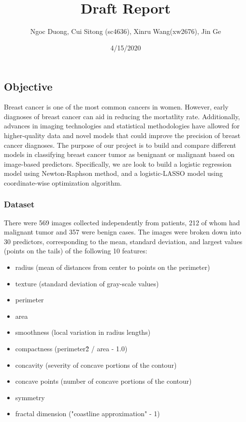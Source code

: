 \documentclass[]{article}
\title{Draft Report}
\author{Ngoc Duong, Cui Sitong (sc4636), Xinru Wang(xw2676), Jin Ge}
\date{4/15/2020}
\begin{document}
\maketitle

\hypertarget{objective}{%
\subsection{Objective}\label{objective}}

Breast cancer is one of the most common cancers in women. However, early
diagnoses of breast cancer can aid in reducing the mortatlity rate.
Additionally, advances in imaging technologies and statistical
methodologies have allowed for higher-quality data and novel models that
could improve the precision of breast cancer diagnoses. The purpose of
our project is to build and compare different models in classifying
breast cancer tumor as benignant or malignant based on image-based
predictors. Specifically, we are look to build a logistic regression
model using Newton-Raphson method, and a logistic-LASSO model using
coordinate-wise optimization algorithm.

\hypertarget{dataset}{%
\subsubsection{Dataset}\label{dataset}}

There were 569 images collected independently from patients, 212 of whom
had malignant tumor and 357 were benign cases. The images were broken
down into 30 predictors, corresponding to the mean, standard deviation,
and largest values (points on the tails) of the following 10 features:

\begin{itemize}
\item radius (mean of distances from center to points on the perimeter)
\item texture (standard deviation of gray-scale values)
\item perimeter
\item area
\item smoothness (local variation in radius lengths)
\item compactness (perimeter\^ 2 / area - 1.0)
\item concavity (severity of concave portions of the contour)
\item concave points (number of concave portions of the contour)
\item symmetry
\item fractal dimension ("coastline approximation" - 1)
\end{itemize}
\end{document}
